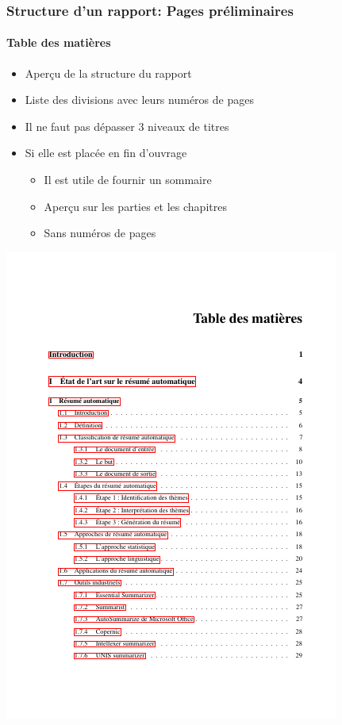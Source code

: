 \documentclass[xcolor=table]{beamer}
\begin{document}
\begin{frame}
\frametitle{Structure d'un rapport: Pages préliminaires}
\framesubtitle{Table des matières}

\begin{minipage}{0.52\textwidth}
	\begin{itemize}
		\item Aperçu de la structure du rapport
		\item Liste des divisions avec leurs numéros de pages 
		\item Il ne faut pas dépasser 3 niveaux de titres
		\item Si elle est placée en fin d'ouvrage
		\begin{itemize}
			\item Il est utile de fournir un sommaire
			\item Aperçu sur les parties et les chapitres
			\item Sans numéros de pages
		\end{itemize}
	\end{itemize}
\end{minipage}
\begin{minipage}{0.42\textwidth}
	\includegraphics[width=\textwidth]{..//img/Bweb03-redaction/sommaire.png}
\end{minipage}

\end{frame}
\end{document}
